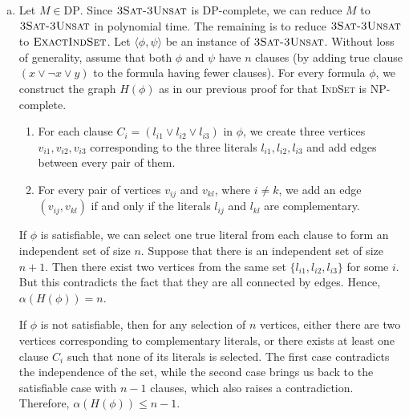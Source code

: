 \begin{enumerate}[(a)]
        On the other hand, let $I\subseteq V$ be an independent set of $G$. Let $I_1 = \{u \,|\, (u,v)\in I\}$. We claim that $I_1$ is an independent set of $G_1$. If $|I_1| = 1$, we are done. Otherwise, for every $u,v\in I_1$, there exist $(u,u'),(v,v')\in I$ for some $u',v'\in V_2$. Since $I$ is an independent set of $G$, we have $((u,u'),(v,v'))\notin E$. By the definition of the lexicographic product, this implies that $(u,v)\notin E_1$. Hence, $I_1$ is an independent set of $G_1$. Similarly, $I_2 = \{v \,|\, (u,v)\in I\}$ is an independent set of $G_2$. Since $I\subseteq I_1\times I_2$, we have $|I|\le |I_1|\cdot |I_2|$. Therefore, if $I$ is a maximum independent set of $G$, then $\alpha(G) = |I|\le |I_1|\cdot |I_2|\le \alpha(G_1)\cdot \alpha(G_2)$. Combining this with the previous result, we have $\alpha(G) = \alpha(G_1)\cdot \alpha(G_2)$.
  \item Let $M\in \text{DP}$. Since $\textsc{3Sat-3Unsat}$ is DP-complete, we can reduce $M$ to $\textsc{3Sat-3Unsat}$ in polynomial time. The remaining is to reduce $\textsc{3Sat-3Unsat}$ to $\textsc{ExactIndSet}$. Let $\langle \phi,\psi\rangle$ be an instance of $\textsc{3Sat-3Unsat}$. Without loss of generality, assume that  both $\phi$ and $\psi$ have $n$ clauses (by adding true clause $(x\vee \neg x \vee y)$ to the formula having fewer clauses). For every formula $\phi$, we construct the graph $H(\phi)$ as in our previous proof for that \textsc{IndSet} is NP-complete.
        \begin{enumerate}[1.]
          \item For each clause $C_i = (l_{i1}\vee l_{i2}\vee l_{i3})$ in $\phi$, we create three vertices $v_{i1}, v_{i2}, v_{i3}$ corresponding to the three literals $l_{i1}, l_{i2}, l_{i3}$ and add edges between every pair of them.
          \item For every pair of vertices $v_{ij}$ and $v_{kl}$, where $i\neq k$, we add an edge $(v_{ij}, v_{kl})$ if and only if the literals $l_{ij}$ and $l_{kl}$ are complementary.
        \end{enumerate}

        If $\phi$ is satisfiable, we can select one true literal from each clause to form an independent set of size $n$. Suppose that there is an independent set of size $n+1$. Then there exist two vertices from the same set $\{l_{i1}, l_{i2}, l_{i3}\}$ for some $i$. But this contradicts the fact that they are all connected by edges. Hence, $\alpha(H(\phi)) = n$.

        If $\phi$ is not satisfiable, then for any selection of $n$ vertices, either there are two vertices corresponding to complementary literals, or there exists at least one clause $C_i$ such that none of its literals is selected. The first case contradicts the independence of the set, while the second case brings us back to the satisfiable case with $n-1$ clauses, which also raises a contradiction. Therefore, $\alpha(H(\phi)) \le n-1$.


\end{enumerate}
